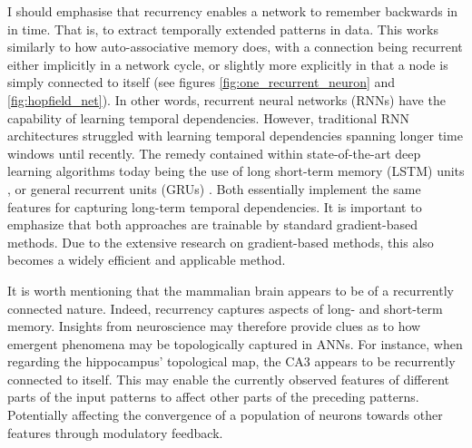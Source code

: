 I should emphasise that recurrency enables a network to remember backwards in in time. That is, to extract temporally extended patterns in data. This works similarly to how auto-associative memory does, with a connection being recurrent either implicitly in a network cycle, or slightly more explicitly in that a node is simply connected to itself (see figures \ref{fig:one_recurrent_neuron} and \ref{fig:hopfield_net}). In other words, recurrent neural networks (RNNs) have the capability of learning temporal dependencies. However, traditional RNN architectures struggled with learning temporal dependencies spanning longer time windows until recently. The remedy contained within state-of-the-art deep learning algorithms today being the use of long short-term memory (LSTM) units \citet{Hochreiter1997}, or general recurrent units (GRUs) \citep{Cho2014}. Both essentially implement the same features for capturing long-term temporal dependencies. It is important to emphasize that both approaches are trainable by standard gradient-based methods. Due to the extensive research on gradient-based methods, this also becomes a widely efficient and applicable method.

It is worth mentioning that the mammalian brain appears to be of a recurrently connected nature. Indeed, recurrency captures aspects of long- and short-term memory. Insights from neuroscience may therefore provide clues as to how emergent phenomena may be topologically captured in ANNs.
For instance, when regarding the hippocampus' topological map, the CA3 appears to be recurrently connected to itself. This may enable the currently observed features of different parts of the input patterns to affect other parts of the preceding patterns. Potentially affecting the convergence of a population of neurons towards other features through modulatory feedback.
\\

